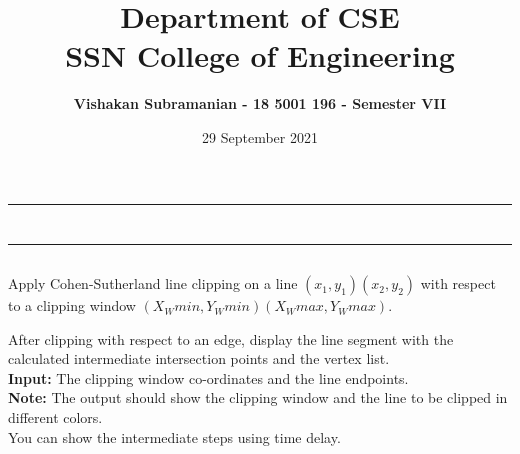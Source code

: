 \documentclass[12pt, a4]{article}
\title{\textbf{Department of CSE\\SSN College of Engineering}}
\author{\textbf{Vishakan Subramanian - 18 5001 196 - Semester VII}}
\date{29 September 2021}
\begin{document}
\maketitle
\hrule
\section*{}
\hrule
\bigskip

\subsection*{}
\subsection*{}
\begin{flushleft}

Apply Cohen-Sutherland line clipping on a line $(x_1, y_1) (x_2, y_2)$ with respect to a clipping window $(X_Wmin, Y_Wmin) (X_Wmax, Y_Wmax)$. 

\bigskip
After clipping with respect to an edge, display the line segment with the calculated intermediate intersection points and the vertex list.\\

\bigskip
\textbf{Input:} The clipping window co-ordinates and the line endpoints.\\

\bigskip
\textbf{Note:} The output should show the clipping window and the line to be clipped in different colors.\\

\bigskip
You can show the intermediate steps using time delay. 
 
\end{flushleft}

\newpage
\subsection*{}
\begin{flushleft}

\end{flushleft}


\newpage
\end{document}
